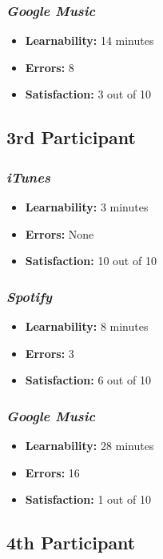 \documentclass{article}
\begin{document}
{\begin{multicols}{2}
\subsubsection{\it Google Music}
\begin{itemize}
\item {\bf Learnability:} 14 minutes
	\item {\bf Errors:} 8
	\item {\bf Satisfaction:} 3 out of 10 
\end{itemize}

\subsection{3rd Participant}

\subsubsection{\it iTunes}
\begin{itemize}
	\item {\bf Learnability:} 3 minutes
	\item {\bf Errors:}  None
	\item {\bf Satisfaction:} 10 out of 10 
\end{itemize}

\subsubsection{\it Spotify}
\begin{itemize}
	\item {\bf Learnability:} 8 minutes
	\item {\bf Errors:} 3
	\item {\bf Satisfaction:} 6 out of 10 
\end{itemize}

\subsubsection{\it Google Music}
\begin{itemize}
\item {\bf Learnability:} 28 minutes
	\item {\bf Errors:} 16
	\item {\bf Satisfaction:} 1 out of 10 
\end{itemize}

\subsection{4th Participant}


\end{multicols}}
\end{document}
